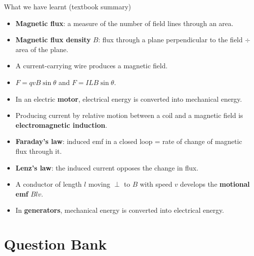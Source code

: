 \documentclass[aspectratio=169,11pt,xcolor=table]{beamer}
\begin{document}
\begin{frame}{What we have learnt (textbook summary)}
\small
\begin{itemize}
\item \textbf{Magnetic flux}: a measure of the number of field lines through an area.
\item \textbf{Magnetic flux density} $B$: flux through a plane perpendicular to the field $\div$ area of the plane.
\item A current-carrying wire produces a magnetic field.
\item $F=qvB\sin\theta$ and $F=ILB\sin\theta$.
\item In an electric \textbf{motor}, electrical energy is converted into mechanical energy.
\item Producing current by relative motion between a coil and a magnetic field is \textbf{electromagnetic induction}.
\item \textbf{Faraday's law}: induced emf in a closed loop = rate of change of magnetic flux through it.
\item \textbf{Lenz's law}: the induced current opposes the change in flux.
\item A conductor of length $l$ moving $\perp$ to $B$ with speed $v$ develops the \textbf{motional emf} $Blv$.
\item In \textbf{generators}, mechanical energy is converted into electrical energy.
\end{itemize}
\end{frame}

\section{Question Bank}
\end{document}
